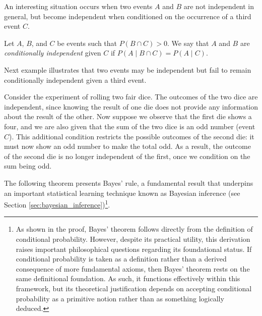 An interesting situation occurs when two events $A$ and $B$ are not independent in general, but become independent when conditioned on the occurrence of a third event $C$.

\begin{definition}
Let $A$, $B$, and $C$ be events such that $P\left( B \cap C \right) > 0$. We say that $A$ and $B$ are \emph{conditionally independent} given $C$ if $P\left(A \mid B \cap C \right) = P\left( A \mid C \right)$.
\end{definition}

Next example illustrates that two events may be independent but fail to remain conditionally independent given a third event.

\begin{example}
Consider the experiment of rolling two fair dice. The outcomes of the two dice are independent, since knowing the result of one die does not provide any information about the result of the other. Now suppose we observe that the first die shows a four, and we are also given that the sum of the two dice is an odd number (event $C$). This additional condition restricts the possible outcomes of the second die: it must now show an odd number to make the total odd. As a result, the outcome of the second die is no longer independent of the first, once we condition on the sum being odd. \end{example}

The following theorem presents Bayes' rule, a fundamental result that underpins an important statistical learning technique known as Bayesian inference (see Section \ref{sec:bayesian_inference})\footnote{As shown in the proof, Bayes' theorem follows directly from the definition of conditional probability. However, despite its practical utility, this derivation raises important philosophical questions regarding its foundational status. If conditional probability is taken as a definition rather than a derived consequence of more fundamental axioms, then Bayes' theorem rests on the same definitional foundation. As such, it functions effectively within this framework, but its theoretical justification depends on accepting conditional probability as a primitive notion rather than as something logically deduced.}.

